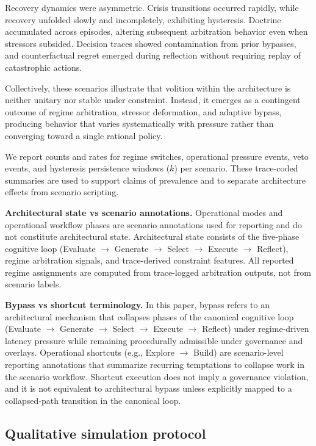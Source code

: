 \documentclass[11pt,a4paper]{article}
\begin{document}
Recovery dynamics were asymmetric. Crisis transitions occurred rapidly, while recovery unfolded slowly and incompletely, exhibiting hysteresis. Doctrine accumulated across episodes, altering subsequent arbitration behavior even when stressors subsided. Decision traces showed contamination from prior bypasses, and counterfactual regret emerged during reflection without requiring replay of catastrophic actions.

Collectively, these scenarios illustrate that volition within the architecture is neither unitary nor stable under constraint. Instead, it emerges as a contingent outcome of regime arbitration, stressor deformation, and adaptive bypass, producing behavior that varies systematically with pressure rather than converging toward a single rational policy.

We report counts and rates for regime switches, operational pressure events, veto events, and hysteresis persistence windows ($k$) per scenario. These trace-coded summaries are used to support claims of prevalence and to separate architecture effects from scenario scripting.

\textbf{Architectural state vs scenario annotations.} Operational modes and operational workflow phases are scenario annotations used for reporting and do not constitute architectural state. Architectural state consists of the five-phase cognitive loop (Evaluate $\to$ Generate $\to$ Select $\to$ Execute $\to$ Reflect), regime arbitration signals, and trace-derived constraint features. All reported regime assignments are computed from trace-logged arbitration outputs, not from scenario labels.

\textbf{Bypass vs shortcut terminology.} In this paper, bypass refers to an architectural mechanism that collapses phases of the canonical cognitive loop (Evaluate $\to$ Generate $\to$ Select $\to$ Execute $\to$ Reflect) under regime-driven latency pressure while remaining procedurally admissible under governance and overlays. Operational shortcuts (e.g., Explore $\to$ Build) are scenario-level reporting annotations that summarize recurring temptations to collapse work in the scenario workflow. Shortcut execution does not imply a governance violation, and it is not equivalent to architectural bypass unless explicitly mapped to a collapsed-path transition in the canonical loop.

\subsection{Qualitative simulation protocol}
\end{document}
